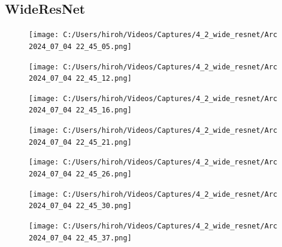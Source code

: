 \documentclass{ltjsarticle}
\begin{document}
\subsection{WideResNet}
\begin{figure}[htbp]
  \centering
  \texttt{[image: C:/Users/hiroh/Videos/Captures/4\_2\_wide\_resnet/Arc 2024\_07\_04 22\_45\_05.png]}
\end{figure}
\begin{figure}[htbp]
  \centering
  \texttt{[image: C:/Users/hiroh/Videos/Captures/4\_2\_wide\_resnet/Arc 2024\_07\_04 22\_45\_12.png]}
\end{figure}
\begin{figure}[htbp]
  \centering
  \texttt{[image: C:/Users/hiroh/Videos/Captures/4\_2\_wide\_resnet/Arc 2024\_07\_04 22\_45\_16.png]}
\end{figure}
\begin{figure}[htbp]
  \centering
  \texttt{[image: C:/Users/hiroh/Videos/Captures/4\_2\_wide\_resnet/Arc 2024\_07\_04 22\_45\_21.png]}
\end{figure}
\begin{figure}[htbp]
  \centering
  \texttt{[image: C:/Users/hiroh/Videos/Captures/4\_2\_wide\_resnet/Arc 2024\_07\_04 22\_45\_26.png]}
\end{figure}
\begin{figure}[htbp]
  \centering
  \texttt{[image: C:/Users/hiroh/Videos/Captures/4\_2\_wide\_resnet/Arc 2024\_07\_04 22\_45\_30.png]}
\end{figure}
\begin{figure}[htbp]
  \centering
  \texttt{[image: C:/Users/hiroh/Videos/Captures/4\_2\_wide\_resnet/Arc 2024\_07\_04 22\_45\_37.png]}
\end{figure}
\end{document}
